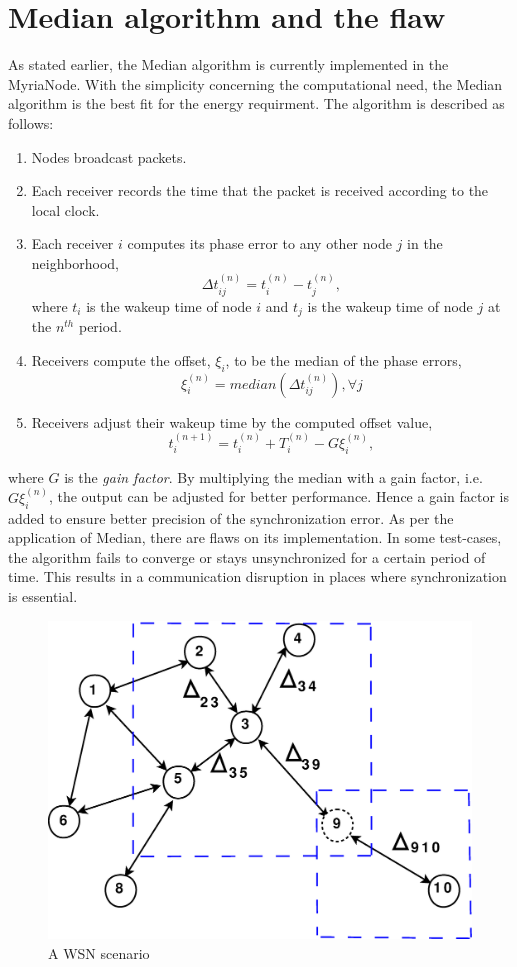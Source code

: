 \documentclass[a4paper,10pt]{report}
\begin{document}
\section{\textbf{Median algorithm and the flaw}} As stated earlier, the Median algorithm
is currently implemented in the MyriaNode. With the simplicity
concerning the computational need, the Median algorithm is the best
fit for the energy requirment. The algorithm is described as
follows:
\begin{enumerate}
\item Nodes broadcast packets.
\item Each receiver records the time that the packet is received according to the local clock.
\item Each receiver $i$ computes its phase error to any other node $j$ in the neighborhood,
\begin{equation}
\Delta t_{ij}^{(n)} = t_i^{(n)} - t_j^{(n)} , \label{pha}
\end{equation}
where $t_i$ is the wakeup time of node $i$ and $t_j$ is the wakeup
time of node $j$ at the $n^{th}$ period.
\item Receivers compute the offset, $\xi_i$, to be the median of the phase errors,
\begin{equation}
\xi_i^{(n)} = median(\Delta t_{ij}^{(n)}) , \forall j
\end{equation}
\item Receivers adjust their wakeup time by the computed offset value,
\begin{equation}
t_{i}^{(n+1)} = t_i^{(n)} + T_i^{(n)} - G\xi_i^{(n)},
\end{equation}
\end{enumerate}
where $G$ is the \textit{gain factor}. By multiplying the median
with a gain factor, i.e. $G\xi_i^{(n)}$, the output can be adjusted
for better performance. Hence a gain factor is added to ensure
better precision of the synchronization error.
\newline
As per the application of Median, there are flaws on its
implementation. In some test-cases, the algorithm fails to converge
or stays unsynchronized for a certain period of time. This results
in a  communication disruption in places where synchronization is
essential.
\begin{figure}
\centering
\includegraphics[width=0.5 \textwidth]{node_field}
\caption{A WSN scenario} \label{wsn}
\end{figure}
\end{document}
